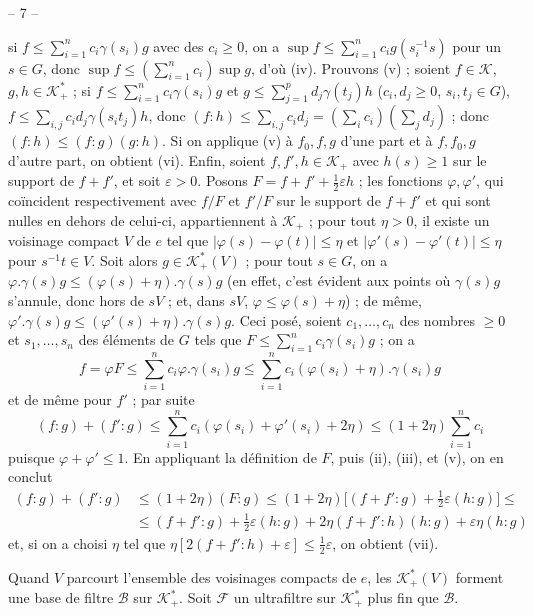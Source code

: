 \begin{center}-- 7 --\end{center}
si $f\le\sum_{i=1}^n c_i\gamma(s_i)g$ avec des $c_i\ge0$,
on a $\sup f\le\sum_{i=1}^n c_i g(s_i^{-1}s)$ pour un $s\in G$,
donc $\sup f\le(\sum_{i=1}^n c_i)\sup g$, d’où (iv).
Prouvons (v) ; soient $f\in\mathcal K$, $g,h\in\mathcal K_+^*$ ;
si $f\le\sum_{i=1}^n c_i\gamma(s_i)g$ et
$g\le\sum_{j=1}^p d_j\gamma(t_j)h$ ($c_i,d_j\ge0$, $s_i,t_j\in G$),
$f\le\sum_{i,j}c_i d_j\gamma(s_i t_j)h$, donc
$(f:h)\le\sum_{i,j}c_i d_j=(\sum_i c_i)(\sum_j d_j)$ ;
donc $(f:h)\le(f:g)(g:h)$.
Si on applique (v) à $f_0,f,g$ d’une part et à $f,f_0,g$ d’autre part,
on obtient (vi). Enfin, soient $f,f',h\in\mathcal K_+$ avec $h(s)\ge1$
sur le support de $f+f'$, et soit $\varepsilon>0$.
Posons $F=f+f'+\frac12\varepsilon h$ ; les fonctions $\varphi,\varphi'$,
qui coïncident respectivement avec $f/F$ et $f'/F$ sur le support de $f+f'$
et qui sont nulles en dehors de celui-ci, appartiennent à $\mathcal K_+$ ;
pour tout $\eta>0$, il existe un voisinage compact $V$ de $e$ tel que
$|\varphi(s)-\varphi(t)|\le\eta$ et $|\varphi'(s)-\varphi'(t)|\le\eta$
pour $s^{-1}t\in V$. Soit alors $g\in\mathcal K_+^*(V)$ ; pour tout $s\in G$,
on a $\varphi.\gamma(s)g\le(\varphi(s)+\eta).\gamma(s)g$
(en effet, c’est évident aux points où $\gamma(s)g$ s’annule, donc hors de $sV$ ;
et, dans $sV$, $\varphi\le\varphi(s)+\eta$) ; de même,
$\varphi'.\gamma(s)g\le(\varphi'(s)+\eta).\gamma(s)g$.
Ceci posé, soient $c_1,\ldots,c_n$ des nombres $\ge0$ et
$s_1,\ldots,s_n$ des éléments de $G$ tels que
$F\le\sum_{i=1}^n c_i\gamma(s_i)g$ ; on a
\[
f=\varphi F\le\sum_{i=1}^n c_i\varphi.\gamma(s_i)g
\le\sum_{i=1}^n c_i(\varphi(s_i)+\eta).\gamma(s_i)g
\]
et de même pour $f'$ ; par suite
\[
(f:g)+(f':g)\le\sum_{i=1}^n c_i(\varphi(s_i)+\varphi'(s_i)+2\eta)
\le(1+2\eta)\sum_{i=1}^n c_i
\]
puisque $\varphi+\varphi'\le1$. En appliquant la définition de $F$,
puis (ii), (iii), et (v), on en conclut
\[
\begin{aligned}
(f:g)+(f':g)&\le(1+2\eta)(F:g)
\le(1+2\eta)\bigl[(f+f':g)+\tfrac12\varepsilon(h:g)\bigr]\le{}\\
&\le(f+f':g)+\tfrac12\varepsilon(h:g)
+2\eta(f+f':h)(h:g)+\varepsilon\eta(h:g)
\end{aligned}
\]
et, si on a choisi $\eta$ tel que
$\eta[2(f+f':h)+\varepsilon]\le\frac12\varepsilon$, on obtient (vii).

Quand $V$ parcourt l’ensemble des voisinages compacts de $e$, les
$\mathcal K_+^*(V)$ forment une base de filtre $\mathcal B$ sur $\mathcal K_+^*$.
Soit $\mathcal F$ un ultrafiltre sur $\mathcal K_+^*$ plus fin que $\mathcal B$.
